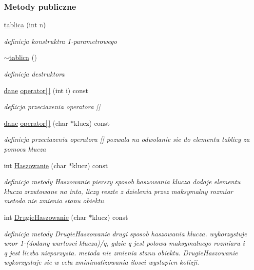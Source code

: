 \subsubsection*{Metody publiczne}
\begin{DoxyCompactItemize}
\item 
\hyperlink{classtablica_a5ee1754d39209bec5987d4cbdf19f210}{tablica} (int n)
\begin{DoxyCompactList}\small\item\em definicja konstruktra 1-\/parametrowego \end{DoxyCompactList}\item 
\hyperlink{classtablica_a75c3c78102abf0e2b70652c174e02012}{$\sim$tablica} ()
\begin{DoxyCompactList}\small\item\em definicja destruktora \end{DoxyCompactList}\item 
\hyperlink{classdane}{dane} \hyperlink{classtablica_aaed9c2371e7f19d46dc0179995df529a}{operator\mbox{[}$\,$\mbox{]}} (int i) const 
\begin{DoxyCompactList}\small\item\em defiicja przeciazenia operatora \mbox{[}\mbox{]} \end{DoxyCompactList}\item 
\hyperlink{classdane}{dane} \hyperlink{classtablica_a8daad41788563f20b42a169da7f3d2fc}{operator\mbox{[}$\,$\mbox{]}} (char $\ast$klucz) const 
\begin{DoxyCompactList}\small\item\em definicja przeciazenia operatora \mbox{[}\mbox{]} pozwala na odwolanie sie do elementu tablicy za pomoca klucza \end{DoxyCompactList}\item 
int \hyperlink{classtablica_a4ea08247dfa3fc56630be6cde3bfa3e1}{Haszowanie} (char $\ast$klucz) const 
\begin{DoxyCompactList}\small\item\em definicja metody Haszowanie pierszy sposob haszowania klucza dodaje elementu klucza zrzutowane na inta, liczy reszte z dzielenia przez maksymalny rozmiar metoda nie zmienia stanu obiektu \end{DoxyCompactList}\item 
int \hyperlink{classtablica_aa87cd29bc045e60e19ccf374112723e2}{Drugie\+Haszowanie} (char $\ast$klucz) const 
\begin{DoxyCompactList}\small\item\em definicja metody Drugie\+Haszowanie drugi sposob haszowania klucza. wykorzystuje wzor 1-\/(dodany wartosci klucza)/q, gdzie q jest polowa maksymalnego rozmiaru i q jest liczba nieparzysta. metoda nie zmienia stanu obiektu. Drugie\+Haszowanie wykorzystuje sie w celu zminimalizowania ilosci wystapien kolizji. \end{DoxyCompactList}\item 

\end{DoxyCompactItemize}
